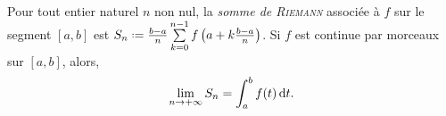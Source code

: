 \begin{theo}
    \cite{acamanes} \\
    Pour tout entier naturel $n$ non nul, la \emph{somme de \textsc{Riemann}} associée à $f$ sur le segment $[a, b]$ est $S_n \defeq \frac{b-a}{n} \sum\limits_{k=0}^{n-1} f \left( a + k \frac{b-a}{n} \right)$. Si $f$ est continue par morceaux sur $[a, b]$, alors, 
    $$\lim_{n \to + \infty} S_n = \int_a^b f(t) \, \mathrm{d} t.$$
\end{theo}

\begin{marginfigure}[-1cm]
    
\end{marginfigure}
